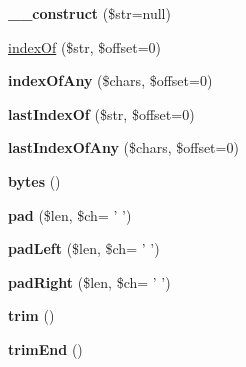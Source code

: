 \begin{DoxyCompactItemize}
\item 
\hypertarget{classString_a0b799cf9b80e4cff537c1f97782f96fd}{
{\bfseries \_\-\_\-construct} (\$str=null)}
\label{classString_a0b799cf9b80e4cff537c1f97782f96fd}

\item 
\hyperlink{classString_a5069041d10f95e4ec9a4be3cd17ab180}{indexOf} (\$str, \$offset=0)
\item 
\hypertarget{classString_a1c8a1df4030974f7ae48f59c1a9dca80}{
{\bfseries indexOfAny} (\$chars, \$offset=0)}
\label{classString_a1c8a1df4030974f7ae48f59c1a9dca80}

\item 
\hypertarget{classString_a18806fe790375032e3fb268f649914d7}{
{\bfseries lastIndexOf} (\$str, \$offset=0)}
\label{classString_a18806fe790375032e3fb268f649914d7}

\item 
\hypertarget{classString_adbe9cb0e51c46bd16881923a7a3d2e4a}{
{\bfseries lastIndexOfAny} (\$chars, \$offset=0)}
\label{classString_adbe9cb0e51c46bd16881923a7a3d2e4a}

\item 
\hypertarget{classString_ae7254778c39de64320813d1da9f2f276}{
{\bfseries bytes} ()}
\label{classString_ae7254778c39de64320813d1da9f2f276}

\item 
\hypertarget{classString_aa8542443a25479d810d0c580680f685d}{
{\bfseries pad} (\$len, \$ch= ' ')}
\label{classString_aa8542443a25479d810d0c580680f685d}

\item 
\hypertarget{classString_ae39386e13e0e87cff555bfaea20ce656}{
{\bfseries padLeft} (\$len, \$ch= ' ')}
\label{classString_ae39386e13e0e87cff555bfaea20ce656}

\item 
\hypertarget{classString_a8ab0df0a7bbe4d99b84356403abf946f}{
{\bfseries padRight} (\$len, \$ch= ' ')}
\label{classString_a8ab0df0a7bbe4d99b84356403abf946f}

\item 
\hypertarget{classString_ac3a075e35b0f39698230957bc7d0172d}{
{\bfseries trim} ()}
\label{classString_ac3a075e35b0f39698230957bc7d0172d}

\item 
\hypertarget{classString_a316e68c5acc7716e4aac01c78a1b5063}{
{\bfseries trimEnd} ()}
\label{classString_a316e68c5acc7716e4aac01c78a1b5063}


\end{DoxyCompactItemize}
